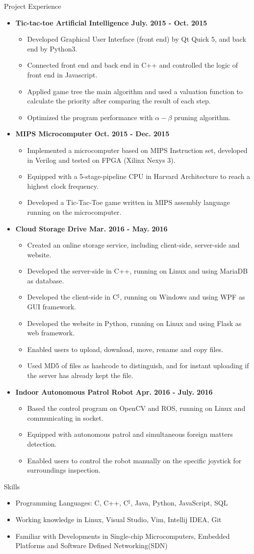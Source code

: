 \documentclass[10pt,oneside]{article}
\newenvironment{ressection}[1]{
	\vspace{4pt}
	{\fontfamily{phv}\selectfont\Large#1}
	\begin{itemize}
	\vspace{3pt}
}{
	\end{itemize}
}
\newcommand{\resitem}[1]{
	\vspace{-4pt}
	\item \begin{flushleft} #1 \end{flushleft}
}
\newcommand{\ressubitem}[1]{
	\vspace{-1pt}
	\item \begin{flushleft} #1 \end{flushleft}
}
\newenvironment{reslist}[1]{
	\resitem{\textbf{#1}}
	\vspace{-5pt}
	\begin{itemize}
}{
	\end{itemize}
}
\begin{document}
\begin{ressection}{Project Experience}
	\begin{reslist}{Tic-tac-toe Artificial Intelligence \hfill July. 2015 - Oct. 2015}
		\ressubitem{Developed Graphical User Interface (front end) by Qt Quick 5, and back end by Python3.}
		\ressubitem{Connected front end and back end in C++ and controlled the logic of front end in Javascript.}
		\ressubitem{Applied game tree the main algorithm and used a valuation function to calculate the priority after comparing the result of each step.}
		\ressubitem{Optimized the program performance with $\alpha-\beta$ pruning algorithm.}
	\end{reslist}
	\begin{reslist}{MIPS Microcomputer \hfill Oct. 2015 - Dec. 2015}
		\ressubitem{Implemented a microcomputer based on MIPS Instruction set, developed in Verilog and tested on FPGA (Xilinx Nexys 3). }
		\ressubitem{Equipped with a 5-stage-pipeline CPU in Harvard Architecture to reach a highest clock frequency.}
		\ressubitem{Developed a Tic-Tac-Toe game written in MIPS assembly language running on the microcomputer.}
	\end{reslist}
	\begin{reslist}{Cloud Storage Drive \hfill Mar. 2016 - May. 2016}
		\ressubitem{Created an online storage service, including client-side, server-side and website.}
		\ressubitem{Developed the server-side in C++, running on Linux and using MariaDB as database.}
		\ressubitem{Developed the client-side in C$^\sharp$, running on Windows and using WPF as GUI framework.}
		\ressubitem{Developed the website in Python, running on Linux and using Flask as web framework.}
		\ressubitem{Enabled users to upload, download, move, rename and copy files.}
		\ressubitem{Used MD5 of files as hashcode to distinguish, and for instant uploading if the server has already kept the file.}
	\end{reslist}
	\begin{reslist}{Indoor Autonomous Patrol Robot \hfill Apr. 2016 - July. 2016}
		\ressubitem{Based the control program on OpenCV and ROS, running on Linux and communicating in socket.}
		\ressubitem{Equipped with autonomous patrol and simultaneous foreign matters detection.}
		\ressubitem{Enabled users to control the robot manually on the specific joystick for surroundings inspection.}
	\end{reslist}
\end{ressection}

\begin{ressection}{Skills}

	\resitem{Programming Languages: C, C++, C$^\sharp$, Java, Python, JavaScript, SQL}
	\resitem{Working knowledge in Linux, Visual Studio, Vim, Intellij IDEA, Git}
	\resitem{Familiar with Developments in Single-chip Microcomputers, Embedded Platforms and Software Defined Networking(SDN)}
	
\end{ressection}
\end{document}
